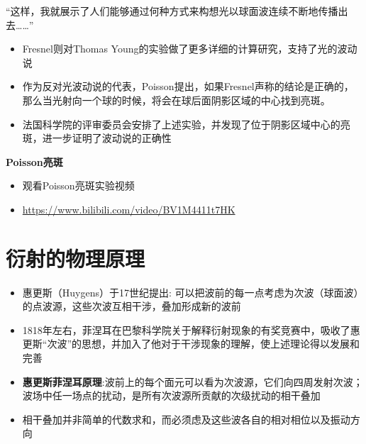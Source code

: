 \documentclass[10pt]{beamer}
\newenvironment{slide}{
    \begin{frame}{\bfseries{\sectiontitle}}
}{
    \end{frame}
}
\let\sectiononly\section
\renewcommand{\section}[1]{
    \sectiononly{#1}
    \let\sectiontitle\relax
    \newcommand{\sectiontitle}{#1}
}
\begin{document}
\begin{slide}
    \begin{shaded}
        {\kaishu “这样，我就展示了人们能够通过何种方式来构想光以球面波连续不断地传播出去……”

        }
    \end{shaded}
    \begin{itemize}
        \item Fresnel则对Thomas Young的实验做了更多详细的计算研究，支持了光的波动说
        \item 作为反对光波动说的代表，Poisson提出，如果Fresnel声称的结论是正确的，那么当光射向一个球的时候，将会在球后面阴影区域的中心找到亮斑。
        \item 法国科学院的评审委员会安排了上述实验，并发现了位于阴影区域中心的亮斑，进一步证明了波动说的正确性
    \end{itemize}
\end{slide}

\begin{slide}
    \textbf{Poisson亮斑}
    \begin{itemize}
        \item 观看Poisson亮斑实验视频
        \item \url{https://www.bilibili.com/video/BV1M4411t7HK}
    \end{itemize}
\end{slide}

\section{衍射的物理原理}

\begin{slide}
    \begin{itemize}
        \item 惠更斯（Huygens）于17世纪提出: 可以把波前的每一点考虑为次波（球面波）的点波源，这些次波互相干涉，叠加形成新的波前

        \item 1818年左右，菲涅耳在巴黎科学院关于解释衍射现象的有奖竞赛中，吸收了惠更斯“次波”的思想，并加入了他对于干涉现象的理解，使上述理论得以发展和完善

        \item \textbf{惠更斯菲涅耳原理}:波前上的每个面元可以看为次波源，它们向四周发射次波；波场中任一场点的扰动，是所有次波源所贡献的次级扰动的相干叠加

        \item 相干叠加并非简单的代数求和，而必须虑及这些波各自的相对相位以及振动方向
    \end{itemize}
\end{slide}
\end{document}
